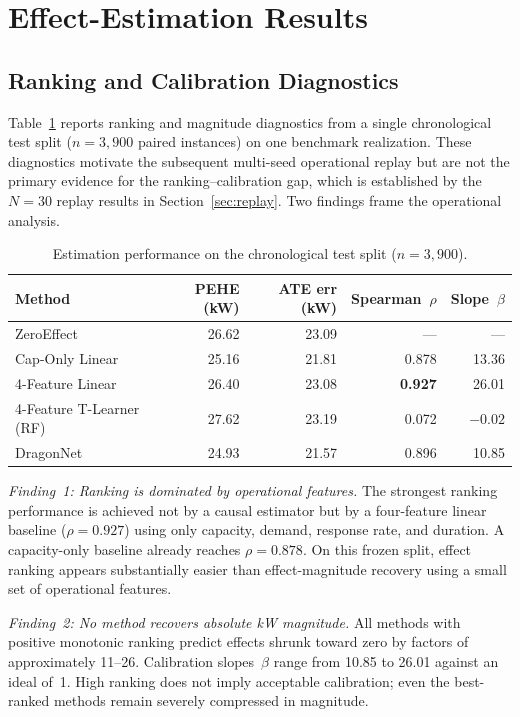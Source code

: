 \documentclass[utf8]{FrontiersinHarvard}
\begin{document}
\section{Effect-Estimation Results}
\label{sec:effect_results}

\subsection{Ranking and Calibration Diagnostics}

Table~\ref{tab:estimation} reports ranking and magnitude
diagnostics from a single chronological test split
($n = 3{,}900$ paired instances) on one benchmark realization.
These diagnostics motivate the subsequent multi-seed operational
replay but are not the primary evidence for the
ranking--calibration gap, which is established by the $N=30$
replay results in Section~\ref{sec:replay}. Two findings frame
the operational analysis.

\begin{table}[h!]
\centering
\caption{Estimation performance on the chronological test split
($n = 3{,}900$).}
\label{tab:estimation}
\begin{tabular}{lrrrr}
\toprule
\textbf{Method} & \textbf{PEHE (kW)} & \textbf{ATE err (kW)}
& \textbf{Spearman~$\rho$} & \textbf{Slope~$\beta$} \\
\midrule
ZeroEffect & 26.62 & 23.09 & --- & --- \\
Cap-Only Linear & 25.16 & 21.81 & 0.878 & 13.36 \\
4-Feature Linear & 26.40 & 23.08 & \textbf{0.927} & 26.01 \\
4-Feature T-Learner (RF) & 27.62 & 23.19 & 0.072 & $-0.02$ \\
DragonNet & 24.93 & 21.57 & 0.896 & 10.85 \\
\bottomrule
\end{tabular}
\end{table}



\textit{Finding~1: Ranking is dominated by operational features.}
The strongest ranking performance is achieved not by a causal
estimator but by a four-feature linear baseline ($\rho = 0.927$)
using only capacity, demand, response rate, and duration. A
capacity-only baseline already reaches $\rho = 0.878$. On this
frozen split, effect ranking appears substantially easier than
effect-magnitude recovery using a small set of operational
features.

\textit{Finding~2: No method recovers absolute kW magnitude.}
All methods with positive monotonic ranking predict effects
shrunk toward zero by factors of approximately 11--26.
Calibration slopes~$\beta$ range from 10.85 to 26.01 against
an ideal of~1. High ranking does not imply acceptable
calibration; even the best-ranked methods remain severely
compressed in magnitude.
\end{document}
